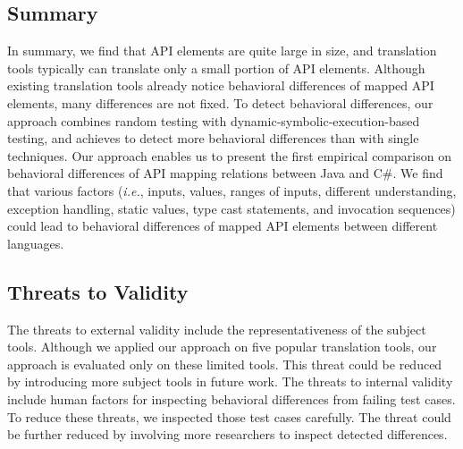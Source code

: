 \subsection{Summary}
\label{sec:evaluation:summary}
In summary, we find that API elements are quite large in size, and translation tools typically can translate only a small portion of API elements. Although existing translation tools already notice behavioral differences of mapped API elements, many differences are not fixed. To detect behavioral differences, our approach combines random testing with dynamic-symbolic-execution-based testing, and achieves to detect more behavioral differences than with single techniques. Our approach enables us to present the first empirical comparison on behavioral differences of API mapping relations between Java and C\#. We find that various factors (\emph{i.e.},  inputs,  values, ranges of inputs, different understanding, exception handling, static values, type cast statements, and invocation sequences) could lead to behavioral differences of mapped API elements between different languages.

\subsection{Threats to Validity}
\label{sec:evaluation:threat}
The threats to external validity include the representativeness of the subject tools. Although we applied
our approach on five popular translation tools, our approach is evaluated only on these limited tools. This threat could be reduced by introducing more subject tools in future work. The threats to internal validity include human factors for inspecting behavioral differences from failing test cases. To reduce these threats, we inspected those test cases carefully. The threat could be further reduced by involving more researchers to inspect detected differences.
